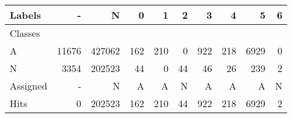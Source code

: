 \begin{tabular}{l|r|r|r|r|r|r|r|r|r}

Labels &      - &       N &    0 &    1 &   2 &    3 &    4 &     5 &  6 \\\hline
Classes  &        &         &      &      &     &      &      &       &    \\\hline
\hline
A        &  11676 &  427062 &  162 &  210 &   0 &  922 &  218 &  6929 &  0 \\\hline
N        &   3354 &  202523 &   44 &    0 &  44 &   46 &   26 &   239 &  2 \\\hline
\hline
Assigned &      - &       N &    A &    A &   N &    A &    A &     A &  N \\\hline
Hits     &      0 &  202523 &  162 &  210 &  44 &  922 &  218 &  6929 &  2 
\end{tabular}
